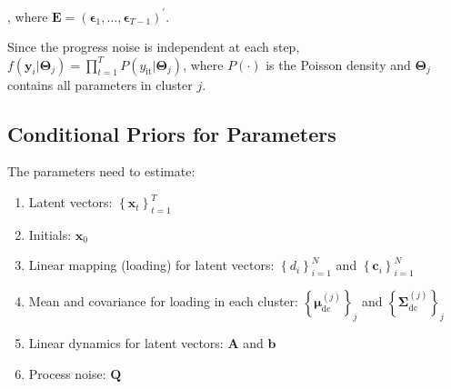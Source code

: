 \documentclass[]{article}
\begin{document}
, where
\(\mathbf{E} = \left( \mathbf{\epsilon}_{1},\ldots,\mathbf{\epsilon}_{T - 1} \right)^{'}\).

Since the progress noise is independent at each step,
\(f\left( \mathbf{y}_{i}|\mathbf{\Theta}_{j} \right) = \prod_{t = 1}^{T}{P(y_{\text{it}}|\mathbf{\Theta}_{j})}\),
where \(P( \cdot )\) is the Poisson density and \(\mathbf{\Theta}_{j}\) contains all parameters in cluster \(j\).

\subsection{Conditional Priors for Parameters}
The parameters need to estimate:
\begin{enumerate}
	\def\labelenumi{(\arabic{enumi})}
	\item
	Latent vectors: \(\left\{ \mathbf{x}_{t} \right\}_{t=1}^T\)
	\item
	Initials: \(\mathbf{x}_{0}\)
	\item
	Linear mapping (loading) for latent vectors:
	\(\left\{ d_{i} \right\}_{i = 1}^{N}\) and
	\(\left\{ \mathbf{c}_{i} \right\}_{i = 1}^{N}\)
	\item
	Mean and covariance for loading in each cluster:
	\(\left\{ \bm{\mu}_{\text{dc}}^{(j)} \right\}_{j}\) and
	\(\left\{ \mathbf{\Sigma}_{\text{dc}}^{(j)} \right\}_{j}\)
	\item
	Linear dynamics for latent vectors: \(\mathbf{A}\) and \(\mathbf{b}\)
	\item
	Process noise: \(\mathbf{Q}\)
\end{enumerate}
\end{document}
